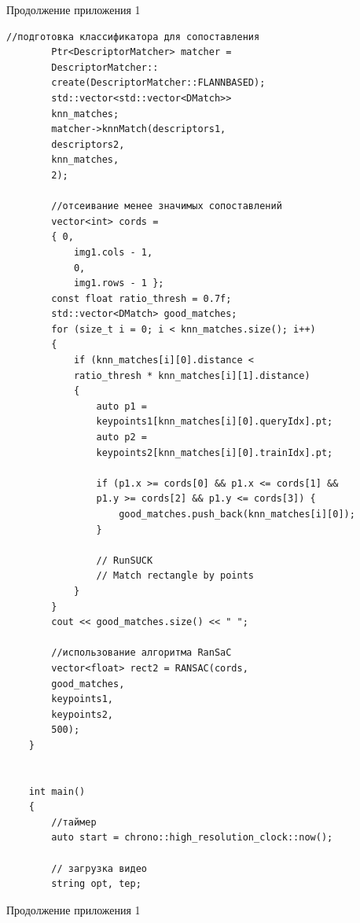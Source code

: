 \documentclass[14pt, a4paper]{extreport}
\begin{document}
\begin{flushright} \noindent Продолжение приложения 1 \end{flushright}
\begin{Verbatim}[fontseries=c, fontsize=\fontsize{10pt}{12pt}\selectfont]
		//подготовка классификатора для сопоставления
		Ptr<DescriptorMatcher> matcher =
		DescriptorMatcher::
		create(DescriptorMatcher::FLANNBASED);
		std::vector<std::vector<DMatch>>
		knn_matches;
		matcher->knnMatch(descriptors1,
		descriptors2,
		knn_matches,
		2);
		
		//отсеивание менее значимых сопоставлений
		vector<int> cords =
		{ 0,
			img1.cols - 1,
			0,
			img1.rows - 1 };
		const float ratio_thresh = 0.7f;
		std::vector<DMatch> good_matches;
		for (size_t i = 0; i < knn_matches.size(); i++)
		{
			if (knn_matches[i][0].distance <
			ratio_thresh * knn_matches[i][1].distance)
			{
				auto p1 =
				keypoints1[knn_matches[i][0].queryIdx].pt;
				auto p2 =
				keypoints2[knn_matches[i][0].trainIdx].pt;
				
				if (p1.x >= cords[0] && p1.x <= cords[1] &&
				p1.y >= cords[2] && p1.y <= cords[3]) {
					good_matches.push_back(knn_matches[i][0]);
				}
				
				// RunSUCK
				// Match rectangle by points
			}
		}
		cout << good_matches.size() << " ";
		
		//использование алгоритма RanSaC
		vector<float> rect2 = RANSAC(cords,
		good_matches,
		keypoints1,
		keypoints2,
		500);
	}
	
	
	int main()
	{
		//таймер
		auto start = chrono::high_resolution_clock::now();
		
		// загрузка видео
		string opt, tep;
\end{Verbatim}
\begin{flushright} \noindent Продолжение приложения 1 \end{flushright}
\end{document}
